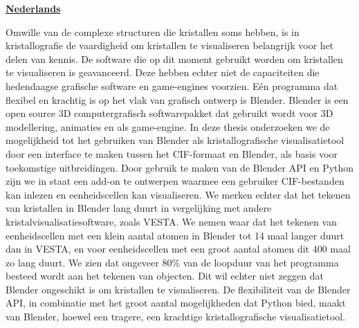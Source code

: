 \textbf{\underline{Nederlands}}
\par
Omwille van de complexe structuren die kristallen soms hebben, is in kristallografie de vaardigheid om kristallen te visualiseren belangrijk voor het delen van kennis. De software die op dit moment gebruikt worden om kristallen te visualiseren is geavanceerd. Deze hebben echter niet de capaciteiten die hedendaagse grafische software en game-engines voorzien. Eén programma dat flexibel en krachtig is op het vlak van grafisch ontwerp is Blender. Blender is een open source 3D computergrafisch softwarepakket dat gebruikt wordt voor 3D modellering, animaties en als game-engine. In deze thesis onderzoeken we de mogelijkheid tot het gebruiken van Blender als kristallografische visualisatietool door een interface te maken tussen het CIF-formaat en Blender, als basis voor toekomstige uitbreidingen. Door gebruik te maken van de Blender API en Python zijn we in staat een add-on te ontwerpen waarmee een gebruiker CIF-bestanden kan inlezen en eenheidscellen kan visualiseren. We merken echter dat het tekenen van kristallen in Blender lang duurt in vergelijking met andere kristalvisualisatiesoftware, zoals VESTA. We nemen waar dat het tekenen van eenheidscellen met een klein aantal atomen in Blender tot 14 maal langer duurt dan in VESTA, en voor eenheidscellen met een groot aantal atomen dit 400 maal zo lang duurt. We zien dat ongeveer 80\% van de loopduur van het programma besteed wordt aan het tekenen van objecten. Dit wil echter niet zeggen dat Blender ongeschikt is om kristallen te visualiseren. De flexibiliteit van de Blender API, in combinatie met het groot aantal mogelijkheden dat Python bied, maakt van Blender, hoewel een tragere, een krachtige kristallografische visualisatietool. 

